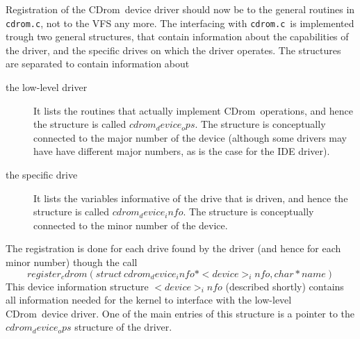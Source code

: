 \documentclass{article}
\def\cdrom{{\sc CDrom}}
\def\cdromc{{\tt cdrom.c}}
\begin{document}
Registration of the \cdrom\ device driver should now be to the general
routines in \cdromc, not to the VFS any more. The interfacing with
\cdromc\ is implemented trough two general structures, that contain
information about the capabilities of the driver, and the specific
drives on which the driver operates. The structures are separated to
contain information about
\begin{description}
\item[the low-level driver] It lists the routines that actually
  implement \cdrom\ operations, and hence the structure is called
  $cdrom_device_ops$. The structure is conceptually connected to the
  major number of the device (although some drivers may have have
  different major numbers, as is the case for the IDE driver).
\item[the specific drive] It lists the variables informative of the
  drive that is driven, and hence the structure is called
  $cdrom_device_info$. The structure is conceptually connected to the
  minor number of the device.
\end{description}

The registration is done for each drive found by the driver (and hence
for each minor number) though the call
$$register_cdrom(struct\ cdrom_device_info * <device>_info, char * name)  
$$
This device information structure $<device>_info$ (described
shortly) contains all information needed for the kernel to interface
with the low-level \cdrom\ device driver. One of the main entries of
this structure is a pointer to the $cdrom_device_ops$ structure of the
driver.
\end{document}
